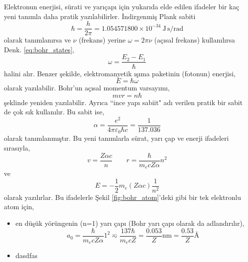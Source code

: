 \documentclass[a4paper,12pt, twoside]{article}
\begin{document}
Elektronun enerjisi, sürati ve yarıçapı için yukarıda elde edilen ifadeler bir kaç yeni tanımla daha pratik yazılabilirler. İndirgenmiş Plank sabiti 
\begin{equation}
\hbar = \frac{h}{2\pi} = 1.054571800 \times 10^{-34}\ \text{J}\,\text{s}/\text{rad}
\label{eq:reduced_planck_const}
\end{equation}
olarak tanımlanırsa ve $\nu$ (frekans) yerine $\omega = 2\pi \nu$ (açısal frekans) kullanılırsa Denk. \ref{eq:bohr_states}, 
\begin{equation}
\omega = \frac{E_2 - E_1}{\hbar}
\label{eq:bohr_states_2pi}
\end{equation}
halini alır. Benzer şekilde, elektromanyetik ışıma paketinin (fotonun) enerjisi,
\begin{equation}
E = \hbar \omega
\label{eq:foton_energy_2pi}
\end{equation}
olarak yazılabilir. Bohr'un açısal momentum varsayımı,
\begin{equation}
m v r = n \hbar
\label{eq:bohr_allowed_states_2pi}
\end{equation}
şeklinde yeniden yazılabilir. Ayrıca ``ince yapı sabiit" adı verilen pratik bir sabit de çok sık kullanılır. Bu sabit ise,
\begin{equation}
\alpha = \frac{e^2}{4\pi\varepsilon_0\hbar c} =\frac{1}{137.036}
\label{eq:fine_structure_const}
\end{equation}
olarak tanımlanmıştır. Bu yeni tanımlarla sürat, yarı çap ve enerji ifadeleri sırasıyla,
\begin{equation}
v = \frac{Z \alpha c}{n} \hspace{24pt} r = \frac{\hbar}{m_e c Z \alpha} n^2
\label{eq:bohr_v_r_2pi}
\end{equation}
ve
\begin{equation}
E = -\frac{1}{2}m_e (Z \alpha c) \frac{1}{n^2}
\label{eq:bohr_E_2pi}
\end{equation}
olarak yazılırlar. Bu ifadelerle Şekil \ref{fig:bohr_atom}'deki gibi bir tek elektronlu atom için,

\begin{itemize}
\item en düşük yörüngenin (n=1) yarı çapı (Bohr yarı çapı olarak da adlandırılır),
\begin{equation}
a_0 = \frac{\hbar}{m_e c Z \alpha} 1^2 \eqsim \frac{137\hbar}{m_e c Z} = \frac{0.053}{Z} \text{nm} = \frac{0.53}{Z} \text{\AA}
\end{equation}

\item dasdfas

\end{itemize}
\end{document}
